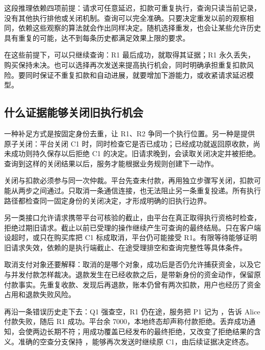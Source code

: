 这段推理依赖四项前提：请求可任意延迟，扣款可重复执行，查询只读当前记录，没有其他执行排他或关闭机制。查询可以完全准确。只要决定重发以前的观察相同，依赖这些观察的算法就会作出同样决定。随机选择重发，也会让某些允许历史具有重复的可能，达不到每条历史都满足效果上限的要求。

在这些前提下，可以只继续查询：R1 最后成功，就取得其证据；R1 永久丢失，购买保持未决。也可以选择再次发送来提高执行机会，同时明确承担重复扣款风险。要同时保证不重复扣款和自动进展，就要增加下游能力，或收紧请求延迟模型。

\subsection*{什么证据能够关闭旧执行机会}

一种补足方式是按固定身份去重，让 R1、R2 争同一个执行位置。另一种是提供原子关闭：平台关闭 C1 时，同时检查它是否已成功；已经成功就返回原收款，尚未成功则持久保存以后拒绝 C1 的决定。旧请求晚到，会读取关闭决定并被拒绝。查询到这样的关闭结果以后，服务才能根据业务规则创建下一动作。

关闭与扣款必须参与同一次仲裁。平台先查未付款，再用独立步骤写关闭，扣款可能从两步之间通过。只取消一条通信连接，也无法阻止另一条重复投递。所有执行路径都检查同一固定身份的关闭决定，才形成明确的旧执行边界。

另一类接口允许请求携带平台可核验的截止，由平台在真正取得执行资格时检查，拒绝过期旧请求。截止以前已受理的操作继续产生可查询的最终结局。只在客户端设超时，或只在购买库把 C1 标成取消，平台仍可能接受 R1。有限等待能够证明旧请求失效，依赖的是执行端截止、在途受理排空和查询完整性等具体条件。

取消支付对象还要解释：取消的是哪个对象，成功后是否仍允许捕获资金，以及它与并发付款怎样裁决。退款发生在已经收款之后，是带新身份的资金动作，保留原付款事实。先重复收款、发现后再退款，账本仍曾有两次扣款，用户也经历了资金占用和退款失败风险。

再沿一条错误历史走下去：Q1 强查空，R1 仍在途，服务把 P1 记为 ，告诉 Alice 付款失败，随后 R1 成功。平台余 7000，本地终态却声称付款拒绝。丢弃成功通知，会使两边长期不符；用成功覆盖已经发布的最终拒绝，又改变了拒绝结果的含义。准确的空查分支保持 ，能够再次发送时继续原 C1，由后续证据决定终态。
